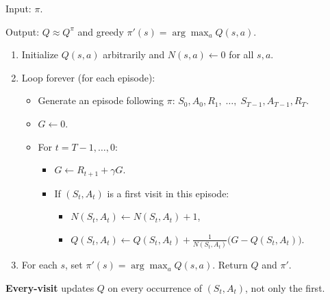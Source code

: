 \begin{implnote}
Input: $\pi$.

Output: $Q\approx Q^\pi$ and greedy $\pi'(s)=\arg\max_a Q(s,a)$.

\begin{enumerate}
\item Initialize $Q(s,a)$ arbitrarily and $N(s,a)\leftarrow 0$ for all $s,a$.
\item Loop forever (for each episode):
\begin{itemize}
\item Generate an episode following $\pi$:   $S_0,A_0,R_1,\;\ldots,\;S_{T-1},A_{T-1},R_T$.
\item $G\leftarrow 0$.
\item For $t=T{-}1,\ldots,0$:
\begin{itemize}
\item $G\leftarrow R_{t+1}+\gamma G$.
\item If $(S_t,A_t)$ is a first visit in this episode:
\begin{itemize}
\item $N(S_t,A_t)\leftarrow N(S_t,A_t)+1$,
\item $Q(S_t,A_t)\leftarrow Q(S_t,A_t)+\frac{1}{N(S_t,A_t)}\bigl(G-Q(S_t,A_t)\bigr)$.
\end{itemize}
\end{itemize}
\end{itemize}
\item For each $s$, set $\pi'(s)=\arg\max_a Q(s,a)$. Return $Q$ and $\pi'$.
\end{enumerate}

\end{implnote}

\textbf{Every-visit} updates $Q$ on every occurrence of $(S_t,A_t)$, not only the first.

